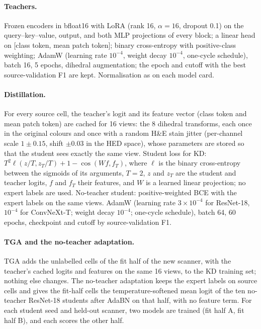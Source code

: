 \paragraph{Teachers.} Frozen encoders in bfloat16 with LoRA (rank 16, $\alpha=16$, dropout 0.1) on the query--key--value,
output, and both MLP projections of every block; a linear head on [class token, mean patch token]; binary cross-entropy
with positive-class weighting; AdamW (learning rate $10^{-4}$, weight decay $10^{-4}$, one-cycle schedule), batch 16,
5 epochs, dihedral augmentation; the epoch and cutoff with the best source-validation F1 are kept. Normalisation as on
each model card.

\paragraph{Distillation.} For every source cell, the teacher's logit and its feature vector (class token and mean patch
token) are cached for 16 views: the 8 dihedral transforms, each once in the original colours and once with a random
H\&E stain jitter (per-channel scale $1\pm0.15$, shift $\pm0.03$ in the HED space), whose parameters are stored so that
the student sees exactly the same view. Student loss for KD: $T^2\ell(z/T, z_T/T) + 1-\cos(Wf, f_T)$, where $\ell$ is the binary cross-entropy between
the sigmoids of its arguments, $T=2$, $z$ and $z_T$ are the student and teacher logits, $f$ and $f_T$ their features, and
$W$ is a learned linear projection; no expert labels are used. No-teacher student: positive-weighted
BCE with the expert labels on the same views. AdamW (learning rate $3\times10^{-4}$ for ResNet-18, $10^{-4}$ for
ConvNeXt-T; weight decay $10^{-4}$; one-cycle schedule), batch 64, 60 epochs, checkpoint and cutoff by source-validation F1.

\paragraph{TGA and the no-teacher adaptation.} TGA adds the unlabelled cells of the fit half of the new scanner, with
the teacher's cached logits and features on the same 16 views, to the KD training set; nothing else changes. The
no-teacher adaptation keeps the expert labels on source cells and gives the fit-half cells the temperature-softened mean
logit of the ten no-teacher ResNet-18 students after AdaBN on that half, with no feature term. For each student seed and
held-out scanner, two models are trained (fit half A, fit half B), and each scores the other half.

